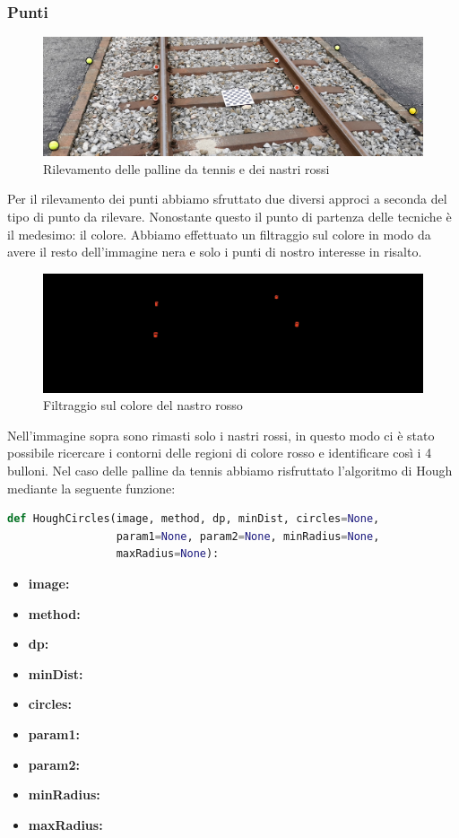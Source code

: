 \documentclass[twoside]{supsistudent}
\begin{document}
\subsubsection{Punti}
\begin{figure}[H]
  \center
  \includegraphics[scale=0.08]{images/points.jpg}
  \caption{Rilevamento delle palline da tennis e dei nastri rossi}
\end{figure}
Per il rilevamento dei punti abbiamo sfruttato due diversi approci a seconda del tipo di punto da rilevare. Nonostante questo il punto di 
partenza delle tecniche è il medesimo: il colore. Abbiamo effettuato un filtraggio sul colore in modo da avere il resto dell'immagine
nera e solo i punti di nostro interesse in risalto. 
\begin{figure}[H]
  \center
  \includegraphics[scale=0.08]{images/points1.jpg}
  \caption{Filtraggio sul colore del nastro rosso}
\end{figure}
Nell'immagine sopra sono rimasti solo i nastri rossi, in questo modo ci è stato possibile ricercare i contorni delle regioni di colore rosso e 
identificare così i 4 bulloni. Nel caso delle palline da tennis abbiamo risfruttato l'algoritmo di Hough mediante la seguente funzione:

\begin{lstlisting}[language=Python]
def HoughCircles(image, method, dp, minDist, circles=None, 
                 param1=None, param2=None, minRadius=None, 
                 maxRadius=None):
\end{lstlisting}
\begin{itemize}
  \item \textbf{image:}
  \item \textbf{method:} 
  \item \textbf{dp:} 
  \item \textbf{minDist:} 
  \item \textbf{circles:} 
  \item \textbf{param1:} 
  \item \textbf{param2:}
  \item \textbf{minRadius:}
  \item \textbf{maxRadius:}
\end{itemize}
\end{document}
